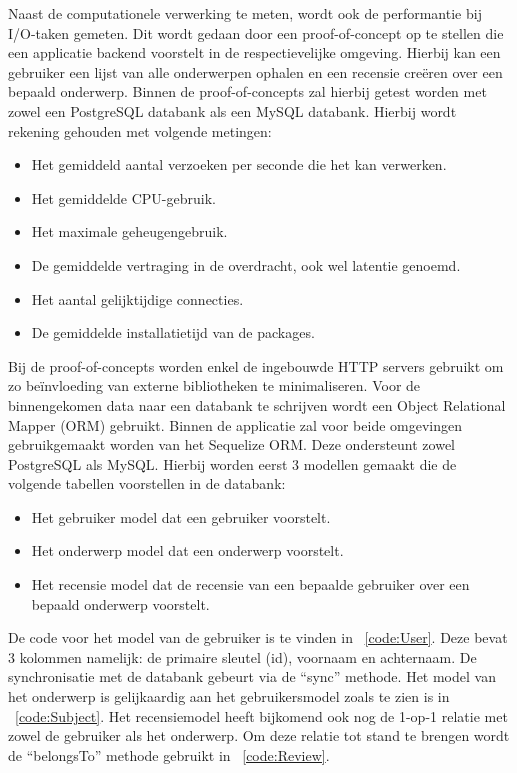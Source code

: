 Naast de computationele verwerking te meten, wordt ook de performantie bij I/O-taken gemeten.
Dit wordt gedaan door een proof-of-concept op te stellen die een applicatie backend voorstelt in de respectievelijke omgeving.
Hierbij kan een gebruiker een lijst van alle onderwerpen ophalen en een recensie creëren over een bepaald onderwerp. 
Binnen de proof-of-concepts zal hierbij getest worden met zowel een PostgreSQL databank als een MySQL databank.
Hierbij wordt rekening gehouden met volgende metingen:
\begin{itemize}
    \item Het gemiddeld aantal verzoeken per seconde die het kan verwerken.
    \item Het gemiddelde CPU-gebruik.
    \item Het maximale geheugengebruik.
    \item De gemiddelde vertraging in de overdracht, ook wel latentie genoemd.
    \item Het aantal gelijktijdige connecties.
    \item De gemiddelde installatietijd van de packages.
\end{itemize}
Bij de proof-of-concepts worden enkel de ingebouwde HTTP servers gebruikt om zo beïnvloeding van externe bibliotheken te minimaliseren.
Voor de binnengekomen data naar een databank te schrijven wordt een Object Relational Mapper (ORM) gebruikt.
Binnen de applicatie zal voor beide omgevingen gebruikgemaakt worden van het Sequelize ORM. Deze ondersteunt zowel PostgreSQL als MySQL.
Hierbij worden eerst 3 modellen gemaakt die de volgende tabellen voorstellen in de databank:
\begin{itemize}
  \item Het gebruiker model dat een gebruiker voorstelt.
  \item Het onderwerp model dat een onderwerp voorstelt.
  \item Het recensie model dat de recensie van een bepaalde gebruiker over een bepaald onderwerp voorstelt.
\end{itemize}
De code voor het model van de gebruiker is te vinden in ~\ref{code:User}. Deze bevat 3 kolommen namelijk: de primaire sleutel (id), voornaam en achternaam.
De synchronisatie met de databank gebeurt via de “sync” methode.
Het model van het onderwerp is gelijkaardig aan het gebruikersmodel zoals te zien is in ~\ref{code:Subject}. Het recensiemodel heeft bijkomend 
ook nog de 1-op-1 relatie met zowel de gebruiker als het onderwerp.
Om deze relatie tot stand te brengen wordt de “belongsTo” methode gebruikt in ~\ref{code:Review}. 
